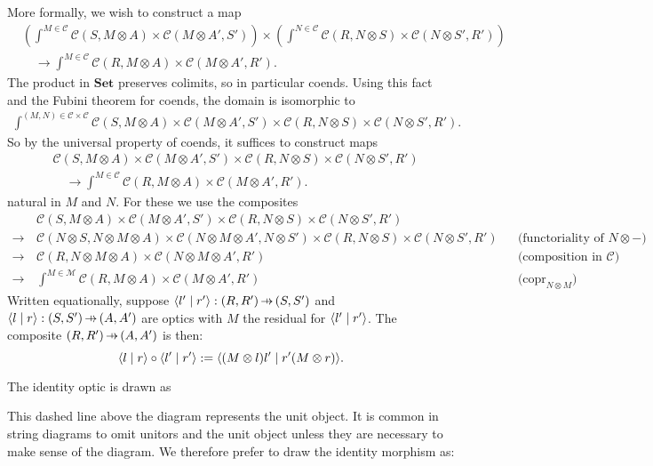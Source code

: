\documentclass[11pt,letterpaper]{article}
\theoremstyle{plain}
\theoremstyle{definition}
\newcommand{\C}{\mathscr{C}}
\newcommand{\M}{\mathscr{M}}
\newcommand{\Set}{\mathbf{Set}}
\DeclareMathOperator{\copr}{copr}
\newcommand{\rep}[2]{{\ensuremath \left\langle #1 \mid #2 \right\rangle}}
\newcommand{\hto}{\ensuremath{\,\mathaccent\shortmid\rightarrow\,}}
\begin{document}
More formally, we wish to construct a map
\begin{align*}
  &\left(\int^{M \in \C} \C(S, M \otimes A) \times \C(M \otimes A', S')\right) \times \left(\int^{N \in \C} \C(R, N \otimes S) \times \C(N \otimes S', R')\right) \\
  &\quad \to \int^{M \in \C} \C(R, M \otimes A) \times \C(M \otimes A', R').
\end{align*}
The product in $\Set$ preserves colimits, so in particular coends. Using this fact and the Fubini theorem for coends, the domain is isomorphic to
\begin{align*}
  \int^{(M, N) \in \C \times \C} \C(S, M \otimes A) \times \C(M \otimes A', S') \times \C(R, N \otimes S) \times \C(N \otimes S', R').
\end{align*}
So by the universal property of coends, it suffices to construct maps
\begin{align*}
  & \C(S, M \otimes A) \times \C(M \otimes A', S') \times \C(R, N \otimes S) \times \C(N \otimes S', R') \\ &
                                                                                                              \quad \to \int^{M \in \C} \C(R, M \otimes A) \times \C(M \otimes A', R').
\end{align*}
natural in $M$ and $N$. For these we use the composites
\begin{align*}
  &\C(S, M \otimes A) \times \C(M \otimes A', S') \times \C(R, N \otimes S) \times \C(N \otimes S', R')\\
  \to \,& \C(N \otimes S, N \otimes M \otimes A) \times \C(N \otimes M \otimes A', N \otimes S') \times \C(R, N \otimes S) \times \C(N \otimes S', R') && \text{(functoriality of $N \otimes  -$)} \\
  \to \,& \C(R, N \otimes  M \otimes A) \times \C(N \otimes M \otimes A', R') && \text{(composition in $\C$)} \\
  \to \,&\int^{M \in \M} \C(R, M \otimes A) \times \C(M \otimes A', R') && \text{($\copr_{N \otimes M}$)}
\end{align*}
Written equationally, suppose $\rep{l'}{r'} : (R, R') \hto (S, S')$ and $\rep{l}{r} : (S, S') \hto (A, A')$ are optics with $M$ the residual for $\rep{l'}{r'}$. The composite $(R, R') \hto (A, A')$ is then: \[\rep{l}{r} \circ \rep{l'}{r'} := \rep{(M \otimes l)l'}{r'(M \otimes r)}.\]

The identity optic is drawn as
\begin{center}
  
\end{center}
This dashed line above the diagram represents the unit object. It is common in string diagrams to omit unitors and the unit object unless they are necessary to make sense of the diagram. We therefore prefer to draw the identity morphism as:
\begin{center}
  
\end{center}
\end{document}
